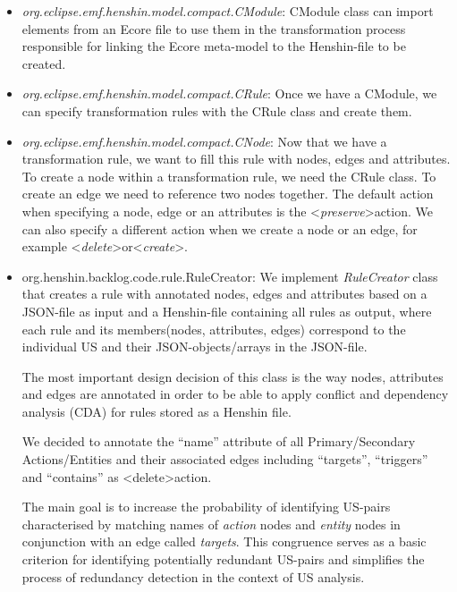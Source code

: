 \begin{itemize}
	\item \textit{org.eclipse.emf.henshin.model.compact.CModule}: CModule class can import elements from an Ecore file to use them in the transformation process responsible for linking the Ecore meta-model to the Henshin-file to be created.
	\item \textit{org.eclipse.emf.henshin.model.compact.CRule}: Once we have a CModule, we can specify transformation rules with the CRule class and create them.
	\item \textit{org.eclipse.emf.henshin.model.compact.CNode}: Now that we have a transformation rule, we want to fill this rule with nodes, edges and attributes. To create a node within a transformation rule, we need the CRule class. To create an edge we need to reference two nodes together. The default action when specifying a node, edge or an attributes is the \textless\emph{preserve}\textgreater action. We can also specify a different action when we create a node or an edge, for example \textless\emph{delete}\textgreater or\textless\emph{create}\textgreater.
	\item org.henshin.backlog.code.rule.RuleCreator: We implement \textit{RuleCreator} class that creates a rule with annotated nodes, edges and attributes based on a JSON-file as input and a Henshin-file containing all rules as output, where each rule and its members(nodes, attributes, edges) correspond to the individual US and their JSON-objects/arrays in the JSON-file. 
	
	The most important design decision of this class is the way nodes, attributes and edges are annotated in order to be able to apply conflict and dependency analysis (CDA) for rules stored as a Henshin file.
	
	We decided to annotate the \enquote{name} attribute of all Primary/Secondary Actions/Entities and their associated edges including \enquote{targets}, \enquote{triggers} and \enquote{contains} as \textless delete\textgreater  action. 
	
	The main goal is to increase the probability of identifying US-pairs characterised by matching names of \textit{action} nodes and \textit{entity} nodes in conjunction with an edge called \textit{targets}. This congruence serves as a basic criterion for identifying potentially redundant US-pairs and simplifies the process of redundancy detection in the context of US analysis.
\end{itemize}
